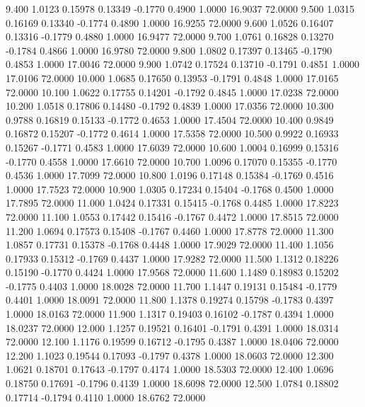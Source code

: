    9.400   1.0123   0.15978   0.13349  -0.1770   0.4900   1.0000  16.9037  72.0000
   9.500   1.0315   0.16169   0.13340  -0.1774   0.4890   1.0000  16.9255  72.0000
   9.600   1.0526   0.16407   0.13316  -0.1779   0.4880   1.0000  16.9477  72.0000
   9.700   1.0761   0.16828   0.13270  -0.1784   0.4866   1.0000  16.9780  72.0000
   9.800   1.0802   0.17397   0.13465  -0.1790   0.4853   1.0000  17.0046  72.0000
   9.900   1.0742   0.17524   0.13710  -0.1791   0.4851   1.0000  17.0106  72.0000
  10.000   1.0685   0.17650   0.13953  -0.1791   0.4848   1.0000  17.0165  72.0000
  10.100   1.0622   0.17755   0.14201  -0.1792   0.4845   1.0000  17.0238  72.0000
  10.200   1.0518   0.17806   0.14480  -0.1792   0.4839   1.0000  17.0356  72.0000
  10.300   0.9788   0.16819   0.15133  -0.1772   0.4653   1.0000  17.4504  72.0000
  10.400   0.9849   0.16872   0.15207  -0.1772   0.4614   1.0000  17.5358  72.0000
  10.500   0.9922   0.16933   0.15267  -0.1771   0.4583   1.0000  17.6039  72.0000
  10.600   1.0004   0.16999   0.15316  -0.1770   0.4558   1.0000  17.6610  72.0000
  10.700   1.0096   0.17070   0.15355  -0.1770   0.4536   1.0000  17.7099  72.0000
  10.800   1.0196   0.17148   0.15384  -0.1769   0.4516   1.0000  17.7523  72.0000
  10.900   1.0305   0.17234   0.15404  -0.1768   0.4500   1.0000  17.7895  72.0000
  11.000   1.0424   0.17331   0.15415  -0.1768   0.4485   1.0000  17.8223  72.0000
  11.100   1.0553   0.17442   0.15416  -0.1767   0.4472   1.0000  17.8515  72.0000
  11.200   1.0694   0.17573   0.15408  -0.1767   0.4460   1.0000  17.8778  72.0000
  11.300   1.0857   0.17731   0.15378  -0.1768   0.4448   1.0000  17.9029  72.0000
  11.400   1.1056   0.17933   0.15312  -0.1769   0.4437   1.0000  17.9282  72.0000
  11.500   1.1312   0.18226   0.15190  -0.1770   0.4424   1.0000  17.9568  72.0000
  11.600   1.1489   0.18983   0.15202  -0.1775   0.4403   1.0000  18.0028  72.0000
  11.700   1.1447   0.19131   0.15484  -0.1779   0.4401   1.0000  18.0091  72.0000
  11.800   1.1378   0.19274   0.15798  -0.1783   0.4397   1.0000  18.0163  72.0000
  11.900   1.1317   0.19403   0.16102  -0.1787   0.4394   1.0000  18.0237  72.0000
  12.000   1.1257   0.19521   0.16401  -0.1791   0.4391   1.0000  18.0314  72.0000
  12.100   1.1176   0.19599   0.16712  -0.1795   0.4387   1.0000  18.0406  72.0000
  12.200   1.1023   0.19544   0.17093  -0.1797   0.4378   1.0000  18.0603  72.0000
  12.300   1.0621   0.18701   0.17643  -0.1797   0.4174   1.0000  18.5303  72.0000
  12.400   1.0696   0.18750   0.17691  -0.1796   0.4139   1.0000  18.6098  72.0000
  12.500   1.0784   0.18802   0.17714  -0.1794   0.4110   1.0000  18.6762  72.0000
